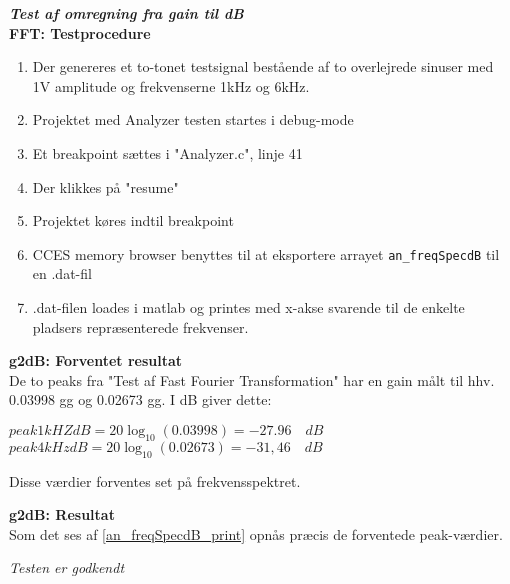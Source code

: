 \textbf{\textit{Test af omregning fra gain til dB}}\\
\textbf{FFT: Testprocedure}
\begin{enumerate}
	\item Der genereres et to-tonet testsignal bestående af to overlejrede sinuser med 1V amplitude og frekvenserne 1kHz og 6kHz.	
	\item Projektet med Analyzer testen startes i debug-mode
	\item Et breakpoint sættes i "Analyzer.c", linje 41 
	\item Der klikkes på "resume"
	\item Projektet køres indtil breakpoint
	\item CCES memory browser benyttes til at eksportere arrayet \verb+an_freqSpecdB+ til en .dat-fil 
	\item .dat-filen loades i matlab og printes med x-akse svarende til de enkelte pladsers repræsenterede frekvenser.
\end{enumerate}

\textbf{g2dB: Forventet resultat} \\
De to peaks fra "Test af Fast Fourier Transformation" har en gain målt til hhv. 0.03998 gg og 0.02673 gg. I dB giver dette:
\begin{center} 
$peak1kHZdB=20\log _{ 10 }{ \left( 0.03998 \right)  } =-27.96\quad dB $ \\
$peak4kHzdB=20\log _{ 10 }{ \left( 0.02673 \right)  } =-31,46\quad dB $
\end{center}
Disse værdier forventes set på frekvensspektret.

\textbf{g2dB: Resultat} \\
Som det ses af \ref{an_freqSpecdB_print} opnås præcis de forventede peak-værdier.
 
\textit{Testen er godkendt}

